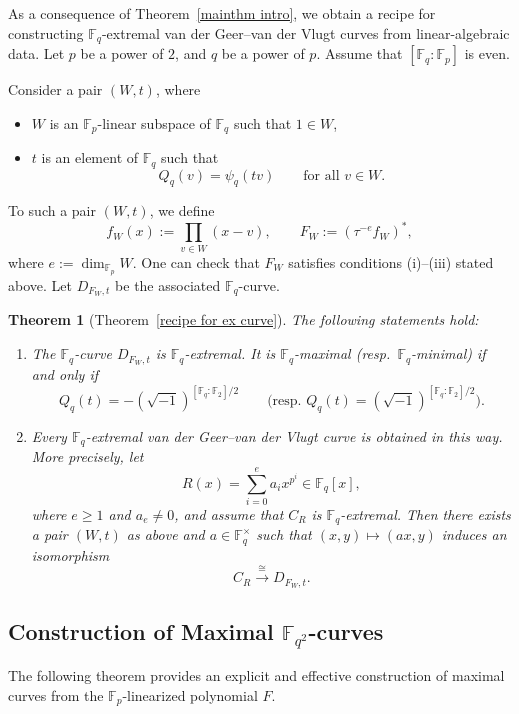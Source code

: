 \documentclass[12pt,a4paper]{amsart}
\newtheorem{theorem}{Theorem}[section]
\theoremstyle{definition}
\def\F{{\mathbb F}}
\theoremstyle{remark}
\begin{document}
\medskip 


As a consequence of Theorem~\ref{mainthm intro}, we obtain a recipe for constructing $\F_q$-extremal van der Geer--van der Vlugt curves from linear-algebraic data. Let $p$ be a power of $2$, and $q$ be a power of $p$. Assume that $[\F_q:\F_p]$ is even. 

Consider a pair $(W,t)$, where 
\begin{itemize}
    \item $W$ is an $\F_p$-linear subspace of $\F_q$ such that $1\in W$, 
    \item $t$ is an element of $\F_q$ such that 
    \[
    Q_q(v)=\psi_q(tv)\qquad\text{for all } v\in W. 
    \]
\end{itemize}
To such a pair $(W,t)$, we define 
\[
f_W(x):=\prod_{v\in W}(x-v),\qquad F_W:=(\tau^{-e}f_W)^\ast, 
\]
where $e:=\dim_{\F_p}W$. One can check that $F_W$ satisfies conditions \textup{(i)--(iii)} stated above. 
Let $D_{F_W,t}$ be the associated $\F_q$-curve. 
\begin{theorem}[Theorem~\ref{recipe for ex curve}]\label{recipe for ex curve intro}
The following statements hold: 
\begin{enumerate}
    \item The $\F_q$-curve $D_{F_W,t}$ is $\F_q$-extremal. It is $\F_q$-maximal (resp.\ $\F_q$-minimal) if and only if 
    \[
    Q_q(t)=-(\sqrt{-1})^{[\F_q:\F_2]/2}\qquad\text{(resp.\ }Q_q(t)=(\sqrt{-1})^{[\F_q:\F_2]/2}\text{)}. 
    \]
    \item Every $\F_q$-extremal van der Geer--van der Vlugt curve is obtained in this way. More precisely, let 
\[R(x)=\sum_{i=0}^e a_i x^{p^i} \in 
 \F_q[x],\]
 where $e\geq1$ and $a_e\neq0$, and assume that $C_R$ is $\F_q$-extremal. Then there exists a pair $(W,t)$ as above and $a\in\F_q^\times$ such that $(x,y)\mapsto (ax,y)$ induces an isomorphism 
 \[
 C_R\xrightarrow{\cong}D_{F_W,t}. 
 \]
\end{enumerate}
\end{theorem}





\subsection{Construction of Maximal $\F_{q^2}$-curves}

The following theorem provides an explicit and effective construction of maximal curves from the $\F_p$-linearized polynomial $F$.
\end{document}
